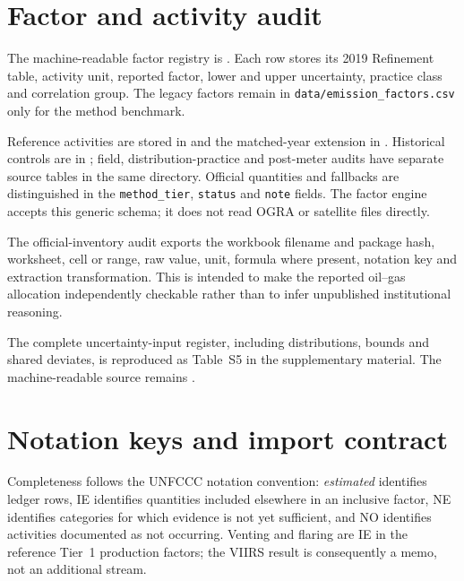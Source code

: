 \section{Factor and activity audit}
\label{app:factors}

The machine-readable factor registry is
. Each row stores its 2019 Refinement table,
activity unit, reported factor, lower and upper uncertainty, practice class and correlation group.
The legacy factors remain in \texttt{data/emission\_factors.csv} only for the method benchmark.

Reference activities are stored in
 and the matched-year extension in
. Historical controls are in
; field, distribution-practice
and post-meter audits have separate source tables in the same directory. Official quantities and
fallbacks are distinguished in the \texttt{method\_tier}, \texttt{status} and \texttt{note}
fields. The factor engine accepts this generic schema; it does not read OGRA or satellite files
directly.

The official-inventory audit exports the workbook filename and package hash, worksheet, cell or
range, raw value, unit, formula where present, notation key and extraction transformation. This
is intended to make the reported oil--gas allocation independently checkable rather than to
infer unpublished institutional reasoning.

The complete uncertainty-input register, including distributions, bounds and shared deviates,
is reproduced as Table~S5 in the supplementary material. The machine-readable source remains
.

\section{Notation keys and import contract}
\label{app:completeness}

Completeness follows the UNFCCC notation convention: \emph{estimated} identifies ledger rows,
IE identifies quantities included elsewhere in an inclusive factor, NE identifies categories
for which evidence is not yet sufficient, and NO identifies activities documented as not
occurring. Venting and flaring are IE in the reference Tier~1 production factors; the VIIRS result
is consequently a memo, not an additional stream.

